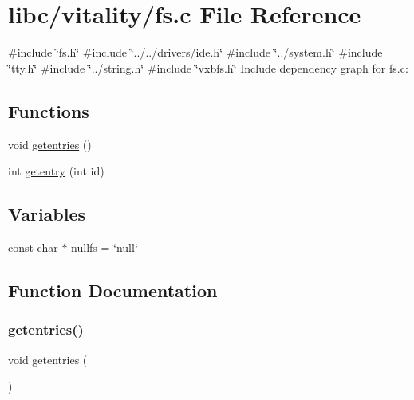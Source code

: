 \hypertarget{a00134}{}\section{libc/vitality/fs.c File Reference}
\label{a00134}
{\ttfamily \#include \char`\"{}fs.\+h\char`\"{}}\newline
{\ttfamily \#include \char`\"{}../../drivers/ide.\+h\char`\"{}}\newline
{\ttfamily \#include \char`\"{}../system.\+h\char`\"{}}\newline
{\ttfamily \#include \char`\"{}tty.\+h\char`\"{}}\newline
{\ttfamily \#include \char`\"{}../string.\+h\char`\"{}}\newline
{\ttfamily \#include \char`\"{}vxbfs.\+h\char`\"{}}\newline
Include dependency graph for fs.\+c\+:
\subsection*{Functions}
\begin{DoxyCompactItemize}
\item 
void \hyperlink{a00134_a414110036132977c34813673360e1a63_a414110036132977c34813673360e1a63}{getentries} ()
\item 
int \hyperlink{a00134_a3fb32d07d3bd05144a196c94fc59c0d1_a3fb32d07d3bd05144a196c94fc59c0d1}{getentry} (int id)
\end{DoxyCompactItemize}
\subsection*{Variables}
\begin{DoxyCompactItemize}
\item 
const char $\ast$ \hyperlink{a00134_a36265ac74fd925405e1179e799961f1e_a36265ac74fd925405e1179e799961f1e}{nullfs} = \char`\"{}null\char`\"{}
\end{DoxyCompactItemize}


\subsection{Function Documentation}
\mbox{\label{a00134_a414110036132977c34813673360e1a63_a414110036132977c34813673360e1a63}} 
\subsubsection{\texorpdfstring{getentries()}{getentries()}}
{\footnotesize\ttfamily void getentries (\begin{DoxyParamCaption}{ }\end{DoxyParamCaption})}



